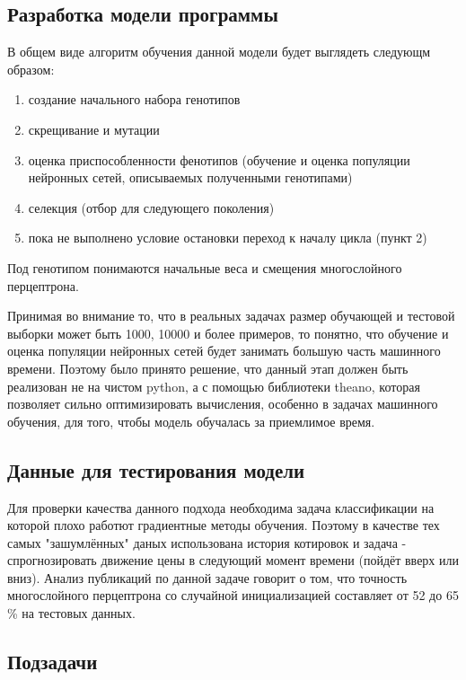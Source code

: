 \documentclass[a4paper,12pt]{article}
\begin{document}
\subsection{Разработка модели программы}
В общем виде алгоритм обучения данной модели будет выглядеть следующм образом:
\begin{enumerate}
\item создание начального набора генотипов
\item скрещивание и мутации
\item оценка приспособленности фенотипов (обучение и оценка популяции нейронных сетей, описываемых полученными генотипами)
\item селекция (отбор для следующего поколения)
\item пока не выполнено условие остановки переход к началу цикла (пункт 2)
\end{enumerate}
Под генотипом понимаются начальные веса и смещения многослойного перцептрона.

\par Принимая во внимание то, что в реальных задачах размер обучающей и тестовой выборки может быть 1000, 10000 и более примеров, то понятно, что обучение и оценка популяции нейронных сетей будет занимать большую часть машинного времени. Поэтому было принято решение, что данный этап должен быть реализован не на чистом python, а с помощью библиотеки theano, которая позволяет сильно оптимизировать вычисления, особенно в задачах машинного обучения, для того, чтобы модель обучалась за приемлимое время.

\subsection{Данные для тестирования модели}

\par Для проверки качества данного подхода необходима задача классификации на которой плохо работют градиентные методы обучения. Поэтому в качестве тех самых "зашумлённых" даных использована история котировок и задача - спрогнозировать движение цены в следующий момент времени (пойдёт вверх или вниз). Анализ публикаций по данной задаче говорит о том, что точность многослойного перцептрона со случайной инициализацией составляет от 52 до 65 \% на тестовых данных.

\subsection{Подзадачи}
\end{document}
